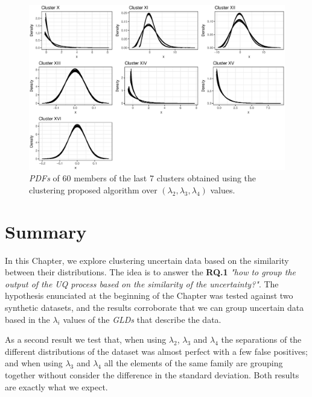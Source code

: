 \begin{figure}[H]
    \centering
    \includegraphics[width=\textwidth]{img/gld_clustering/datasetII/l3l4/clusters_part_II_scale_2.eps}
    \caption{\textit{PDFs} of 60 members of the last 7 clusters obtained using the clustering  proposed algorithm over $(\lambda_{2}, \lambda_{3}, \lambda_{4})$ values.}
    \label{fig:dataset2_l3l4_cl12}
\end{figure}

\section{Summary}\label{sec:clustering_summary}

In this Chapter, we explore clustering uncertain data based on the similarity between their distributions. The idea is to answer the \textbf{RQ.1} \textit{"how to group the output of the UQ process based on the similarity of the uncertainty?"}. The hypothesis enunciated at the beginning of the Chapter was tested against two synthetic datasets, and the results corroborate that we can group uncertain data based in the $\lambda_{i}$ values of the \textit{GLDs} that describe the data.

As a second result we test that, when using $\lambda_{2}$, $\lambda_{3}$ and $\lambda_{4}$ the separations of the different distributions of the dataset was almost perfect with a few false positives; and when using $\lambda_{3}$ and $\lambda_{4}$ all the elements of the same family are grouping together without consider the difference in the standard deviation. Both results are exactly what we expect.

